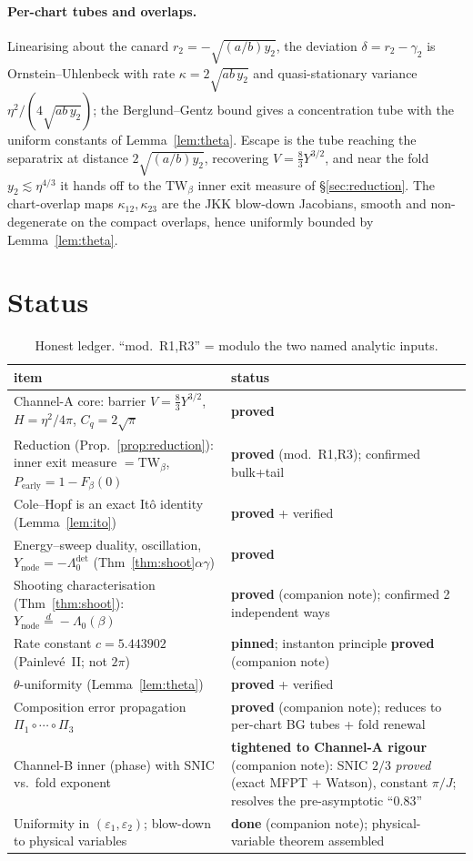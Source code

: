\documentclass[11pt]{article}
\theoremstyle{remark}
\newcommand{\Ynode}{Y_{\mathrm{node}}}
\newcommand{\TW}{\mathrm{TW}}
\newcommand{\Pearly}{P_{\mathrm{early}}}
\newcommand{\Lamdet}{\Lambda_0^{\mathrm{det}}}
\newcommand{\eqd}{\stackrel{d}{=}}
\begin{document}
\paragraph{Per-chart tubes and overlaps.} Linearising about the canard
$r_2=-\sqrt{(a/b)y_2}$, the deviation $\delta=r_2-\gamma_2$ is Ornstein--Uhlenbeck with
rate $\kappa=2\sqrt{ab\,y_2}$ and quasi-stationary variance $\eta^2/(4\sqrt{ab\,y_2})$;
the Berglund--Gentz bound gives a concentration tube with the uniform constants of
Lemma~\ref{lem:theta}. Escape is the tube reaching the separatrix at distance
$2\sqrt{(a/b)y_2}$, recovering $V=\tfrac83Y^{3/2}$, and near the fold
$y_2\lesssim\eta^{4/3}$ it hands off to the $\TW_\beta$ inner exit measure of
\S\ref{sec:reduction}. The chart-overlap maps $\kappa_{12},\kappa_{23}$ are the JKK
blow-down Jacobians, smooth and non-degenerate on the compact overlaps, hence
uniformly bounded by Lemma~\ref{lem:theta}.

\section{Status}\label{sec:status}

\begin{table}[h]\centering
\begin{tabular}{@{}p{}l@{}}
\toprule
item & status \\
\midrule
Channel-A core: barrier $V=\tfrac83Y^{3/2}$, $H=\eta^2/4\pi$, $C_q=2\sqrt\pi$ & \textbf{proved} \\
Reduction (Prop.~\ref{prop:reduction}): inner exit measure $=\TW_\beta$, $\Pearly=1-F_\beta(0)$ & \textbf{proved} (mod.\ R1,R3); confirmed bulk+tail \\
Cole--Hopf is an exact It\^o identity (Lemma~\ref{lem:ito}) & \textbf{proved} + verified \\
Energy--sweep duality, oscillation, $\Ynode=-\Lamdet$ (Thm~\ref{thm:shoot}$\alpha\gamma$) & \textbf{proved} \\
Shooting characterisation (Thm~\ref{thm:shoot}): $\Ynode\eqd-\Lambda_0(\beta)$ & \textbf{proved} (companion note); confirmed 2 independent ways \\
Rate constant $c=5.443902$ (Painlev\'e~II; not $2\pi$) & \textbf{pinned}; instanton principle \textbf{proved} (companion note) \\
$\theta$-uniformity (Lemma~\ref{lem:theta}) & \textbf{proved} + verified \\
Composition error propagation $\Pi_1\!\circ\!\cdots\!\circ\!\Pi_3$ & \textbf{proved} (companion note); reduces to per-chart BG tubes + fold renewal \\
Channel-B inner (phase) with SNIC vs.\ fold exponent & \textbf{tightened to Channel-A rigour} (companion note): SNIC $2/3$ \emph{proved} (exact MFPT + Watson), constant $\pi/J$; resolves the pre-asymptotic ``$0.83$'' \\
Uniformity in $(\varepsilon_1,\varepsilon_2)$; blow-down to physical variables & \textbf{done} (companion note); physical-variable theorem assembled \\
\bottomrule
\end{tabular}
\caption{Honest ledger. ``mod.\ R1,R3'' = modulo the two named analytic inputs.}
\end{table}
\end{document}
